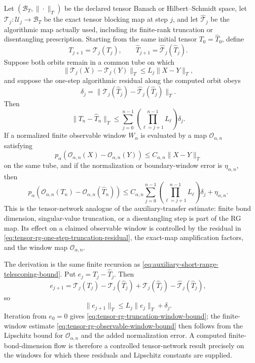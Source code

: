 \begin{controlledapproximation}
\label{cap:tensor-rg-truncation-windows}
Let \((\mathcal B_T,\|\cdot\|_T)\) be the declared tensor Banach or
Hilbert--Schmidt space, let
\(\mathcal T_j:\mathcal U_j\to\mathcal B_T\) be the exact tensor blocking map
at step \(j\), and let
\(\widehat{\mathcal T}_j\) be the algorithmic map actually used, including its
finite-rank truncation or disentangling prescription.  Starting from the same
initial tensor \(T_0=\widehat T_0\), define
\[
  T_{j+1}=\mathcal T_j(T_j),
  \qquad
  \widehat T_{j+1}=\widehat{\mathcal T}_j(\widehat T_j).
\]
Suppose both orbits remain in a common tube on which
\[
  \|\mathcal T_j(X)-\mathcal T_j(Y)\|_T
  \le L_j\|X-Y\|_T ,
\]
and suppose the one-step algorithmic residual along the computed orbit obeys
\begin{equation}
  \delta_j
  =
  \|\mathcal T_j(\widehat T_j)-\widehat{\mathcal T}_j(\widehat T_j)\|_T .
  \label{eq:tensor-rg-one-step-truncation-residual}
\end{equation}
Then
\begin{equation}
  \|T_n-\widehat T_n\|_T
  \le
  \sum_{j=0}^{n-1}
  \left(\prod_{\ell=j+1}^{n-1}L_\ell\right)\delta_j .
  \label{eq:tensor-rg-truncation-window-bound}
\end{equation}
If a normalized finite observable window \(W_\alpha\) is evaluated by a map
\(\mathcal O_{\alpha,n}\) satisfying
\[
  p_\alpha(\mathcal O_{\alpha,n}(X)-\mathcal O_{\alpha,n}(Y))
  \le C_{\alpha,n}\|X-Y\|_T
\]
on the same tube, and if the normalization or boundary-window error is
\(\eta_{\alpha,n}\), then
\begin{equation}
  p_\alpha\!\left(
    \mathcal O_{\alpha,n}(T_n)-\mathcal O_{\alpha,n}(\widehat T_n)
  \right)
  \le
  C_{\alpha,n}
  \sum_{j=0}^{n-1}
  \left(\prod_{\ell=j+1}^{n-1}L_\ell\right)\delta_j
  +\eta_{\alpha,n}.
  \label{eq:tensor-rg-observable-window-bound}
\end{equation}
This is the tensor-network analogue of the auxiliary-transfer estimate:
finite bond dimension, singular-value truncation, or a disentangling step is
part of the RG map.  Its effect on a claimed observable window is controlled
by the residual in \eqref{eq:tensor-rg-one-step-truncation-residual}, the
exact-map amplification factors, and the window map
\(\mathcal O_{\alpha,n}\).
\end{controlledapproximation}

The derivation is the same finite recursion as
\eqref{eq:auxiliary-short-range-telescoping-bound}.  Put
\(e_j=T_j-\widehat T_j\).  Then
\[
  e_{j+1}
  =
  \mathcal T_j(T_j)-\mathcal T_j(\widehat T_j)
  +
  \mathcal T_j(\widehat T_j)-\widehat{\mathcal T}_j(\widehat T_j),
\]
so
\[
  \|e_{j+1}\|_T\le L_j\|e_j\|_T+\delta_j .
\]
Iteration from \(e_0=0\) gives
\eqref{eq:tensor-rg-truncation-window-bound}; the finite-window estimate
\eqref{eq:tensor-rg-observable-window-bound} then follows from the Lipschitz
bound for \(\mathcal O_{\alpha,n}\) and the added normalization error.  A
computed finite-bond-dimension flow is therefore a controlled tensor-network
result precisely on the windows for which these residuals and Lipschitz
constants are supplied.

